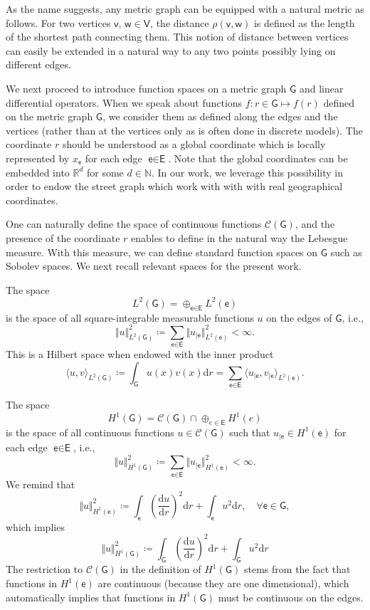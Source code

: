 \documentclass[11pt,a4paper,twoside]{article}
\theoremstyle{definition}
\numberwithin{equation}{section}
\newcommand{\cC}{\ensuremath{\mathcal{C}}}
\newcommand{\bN}{\ensuremath{\mathbb{N}}}
\newcommand{\bR}{\ensuremath{\mathbb{R}}}
\newcommand{\G}{\ensuremath{\textsf{G}}} %
\newcommand{\E}{\ensuremath{\textsf{E}}} %
\newcommand{\V}{\ensuremath{\textsf{V}}} %
\newcommand{\vv}{\ensuremath{\textsf{v}}}
\newcommand{\ww}{\ensuremath{\textsf{w}}}
\newcommand{\ee}{\ensuremath{\textsf{e}}}
\newcommand{\<}{\langle}
\renewcommand{\>}{\rangle}
\newcommand{\dd}{\ensuremath{\mathrm d}}
\newcommand{\dr}{\ensuremath{\mathrm dr}}
\begin{document}
As the name suggests, any metric graph can be equipped with a natural metric as follows. For two vertices $\vv,\,\ww\in \V$, the distance $\rho(\vv,\ww)$ is defined as the length of the shortest path connecting them. This notion of distance between vertices can easily be extended in a natural way to any two points possibly lying on different edges.

We next proceed to introduce function spaces on a metric graph $\G$ and linear differential operators. When we speak about functions $f:r\in \G\mapsto f(r)$ defined on the metric graph $\G$, we consider them as defined along the edges and the vertices (rather than at the vertices only as is often done in discrete models). The coordinate $r$ should be understood as a global coordinate which is locally represented by $x_\ee$ for each edge $\ee\in \E$. Note that the global coordinates can be embedded into $\bR^d$ for some $d\in \bN$. In our work, we leverage this possibility in order to endow the street graph which work with with with real geographical coordinates.

One can naturally define the space of continuous functions $\cC(\G)$, and the presence of the coordinate $r$ enables to define in the natural way the Lebesgue measure. With this measure, we can define standard function spaces on $\G$ such as Sobolev spaces. We next recall relevant spaces for the present work.


The space
$$
L^2(\G) = \oplus_{\ee\in \E} L^2(\ee)
$$
is the space of all square-integrable measurable functions $u$ on the edges of $\G$, i.e.,
\begin{equation}
      \Vert u \Vert^2_{L^2(\G)} \coloneqq \sum_{\ee\in \E} \Vert u_{|\ee} \Vert^2_{L^2(\ee)} <\infty.
\end{equation}
This is a Hilbert space when endowed with the inner product
$$
\<u, v \>_{L^2(\G)}
\coloneqq \int_\G u(x)v(x)\dr
=\sum_{\ee\in \E} \< u_{|\ee} , v_{|\ee}\>_{L^2(\ee)}.
$$

The space 
$$
H^1(\G) =  \cC(\G)\cap\oplus_{e\in \E} H^1(e)
$$
is the space of all continuous functions $u\in \cC(\G)$ such that $u_{|\ee} \in H^1(\ee)$ for each edge $\ee\in \E$, i.e.,
\begin{equation}
      \Vert u \Vert^2_{H^1(\G)} \coloneqq \sum_{\ee\in \E} \Vert u_{|\ee} \Vert^2_{H^1(\ee)} <\infty.
\end{equation}
We remind that
$$
\Vert u \Vert^2_{H^1(\ee)} \coloneqq \int_\ee \left( \frac{\dd u}{\dr} \right)^2 \dr + \int_\ee u^2\dr,\quad \forall \ee \in \G,
$$
which implies
$$
\Vert u \Vert^2_{H^1(\G)} \coloneqq \int_\G \left( \frac{\dd u}{\dr} \right)^2 \dr + \int_\G u^2\dr
$$
The restriction to $\cC(\G)$ in the definition of $H^1(\G)$ stems from the fact that functions in $H^1(\ee)$ are continuous (because they are one dimensional), which automatically implies that functions in $H^1(\G)$ must be continuous on the edges.
\end{document}
